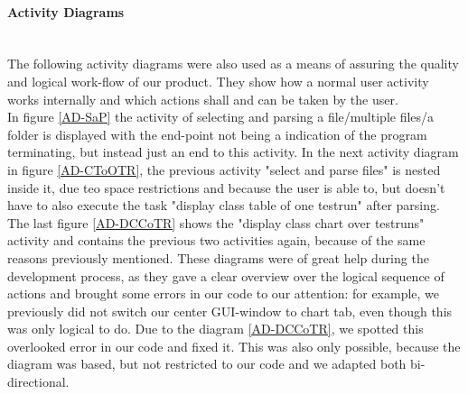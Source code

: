 \paragraph{Activity Diagrams}
\ \\
The following activity diagrams were also used as a means of assuring the quality and logical work-flow of our product. They show how a normal user activity works internally and which actions shall and can be taken by the user.\\ 
In figure \ref{AD-SaP} the activity of selecting and parsing a file/multiple files/a folder is displayed with the end-point not being a indication of the program terminating, but instead just an end to this activity. In the next activity diagram in figure \ref{AD-CToOTR}, the previous activity "select and parse files" is nested inside it, due teo space restrictions and because the user is able to, but doesn't have to also execute the task "display class table of one testrun" after parsing. The last figure \ref{AD-DCCoTR} shows the "display class chart over testruns" activity and contains the previous two activities again, because of the same reasons previously mentioned. These diagrams were of great help during the development process, as they gave a clear overview over the logical sequence of actions and brought some errors in our code to our attention: for example, we previously did not switch our center GUI-window to chart tab, even though this was only logical to do. Due to the diagram \ref{AD-DCCoTR}, we spotted this overlooked error in our code and fixed it. This was also only possible, because the diagram was based, but not restricted to our code and we adapted both bi-directional.\\


